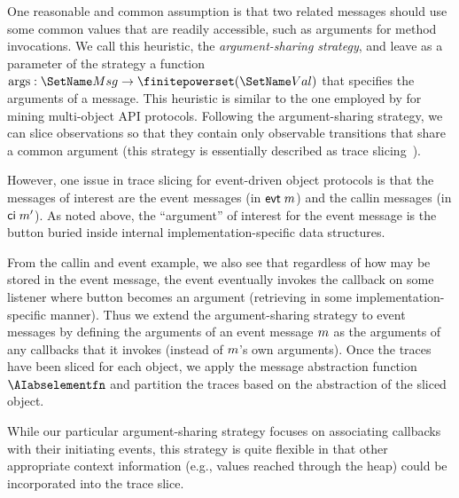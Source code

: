 \documentclass[10pt,reprint,nocopyrightspace,numbers]{sigplanconf}
\begin{document}
One reasonable and common assumption is that two related messages should use some common values that are readily accessible, such as arguments for method invocations.
We call this heuristic, the \emph{argument-sharing strategy}, and leave as a parameter of the strategy a function $\Args : \MsgSet \rightarrow \finitepowerset(\ValSet)$ that specifies the arguments of a message.
This heuristic is similar to the one employed by \citet{DBLP:conf/kbse/PradelG09} for mining multi-object API protocols.
Following the argument-sharing strategy, we can slice observations so that they contain only observable transitions that share a common argument (this strategy is essentially described as trace slicing~\cite{DBLP:conf/tacas/ChenR09}). 

However, one issue in trace slicing for event-driven object protocols is that the messages of interest are the event messages (in $\mathsf{evt}\;m$) and the callin messages (in $\mathsf{ci}\;m'$).
As noted above, the ``argument'' of interest for the  event message is the button  buried inside internal implementation-specific data structures.

From the  callin and  event example, we also see that regardless of how  may be stored in the  event message, the  event eventually invokes the callback  on some listener  where button  becomes an argument (retrieving  in some implementation-specific manner).
Thus we extend the argument-sharing strategy to event messages by defining the arguments of an event message $m$ as the arguments of any callbacks that it invokes (instead of $m$'s own arguments).
%
Once the traces have been sliced for each object, we apply the message abstraction function $\abselem$ and partition the traces based on the abstraction of the sliced object.

While our particular argument-sharing strategy focuses on associating callbacks with their initiating events, this strategy is quite flexible in that other appropriate context information (e.g., values reached through the heap) could be incorporated into the trace slice.
\end{document}
